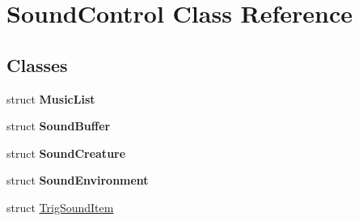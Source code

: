 \hypertarget{classSoundControl}{\section{\-Sound\-Control \-Class \-Reference}
\label{classSoundControl}
}
\subsection*{\-Classes}
\begin{DoxyCompactItemize}
\item 
struct {\bfseries \-Music\-List}
\item 
struct {\bfseries \-Sound\-Buffer}
\item 
struct {\bfseries \-Sound\-Creature}
\item 
struct {\bfseries \-Sound\-Environment}
\item 
struct \hyperlink{structSoundControl_1_1TrigSoundItem}{\-Trig\-Sound\-Item}
\end{DoxyCompactItemize}

